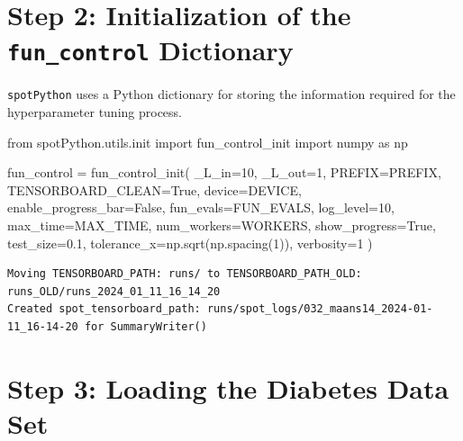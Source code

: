 \documentclass[
  letterpaper,
  DIV=11,
  numbers=noendperiod]{scrreprt}
\newenvironment{Shaded}{\begin{snugshade}}{\end{snugshade}}
\newcommand{\DecValTok}[1]{\textcolor[rgb]{0.68,0.00,0.00}{#1}}
\newcommand{\FloatTok}[1]{\textcolor[rgb]{0.68,0.00,0.00}{#1}}
\newcommand{\ImportTok}[1]{\textcolor[rgb]{0.00,0.46,0.62}{#1}}
\newcommand{\NormalTok}[1]{\textcolor[rgb]{0.00,0.23,0.31}{#1}}
\newcommand{\OperatorTok}[1]{\textcolor[rgb]{0.37,0.37,0.37}{#1}}
\newcommand{\VariableTok}[1]{\textcolor[rgb]{0.07,0.07,0.07}{#1}}
\begin{document}
\section{\texorpdfstring{Step 2: Initialization of the
\texttt{fun\_control}
Dictionary}{Step 2: Initialization of the fun\_control Dictionary}}\label{step-2-initialization-of-the-fun_control-dictionary-1}

\texttt{spotPython} uses a Python dictionary for storing the information
required for the hyperparameter tuning process.

\begin{Shaded}
\begin{Highlighting}[]
\ImportTok{from}\NormalTok{ spotPython.utils.init }\ImportTok{import}\NormalTok{ fun\_control\_init}
\ImportTok{import}\NormalTok{ numpy }\ImportTok{as}\NormalTok{ np}

\NormalTok{fun\_control }\OperatorTok{=}\NormalTok{ fun\_control\_init(}
\NormalTok{    \_L\_in}\OperatorTok{=}\DecValTok{10}\NormalTok{,}
\NormalTok{    \_L\_out}\OperatorTok{=}\DecValTok{1}\NormalTok{,}
\NormalTok{    PREFIX}\OperatorTok{=}\NormalTok{PREFIX,}
\NormalTok{    TENSORBOARD\_CLEAN}\OperatorTok{=}\VariableTok{True}\NormalTok{,}
\NormalTok{    device}\OperatorTok{=}\NormalTok{DEVICE,}
\NormalTok{    enable\_progress\_bar}\OperatorTok{=}\VariableTok{False}\NormalTok{,}
\NormalTok{    fun\_evals}\OperatorTok{=}\NormalTok{FUN\_EVALS,}
\NormalTok{    log\_level}\OperatorTok{=}\DecValTok{10}\NormalTok{,}
\NormalTok{    max\_time}\OperatorTok{=}\NormalTok{MAX\_TIME,}
\NormalTok{    num\_workers}\OperatorTok{=}\NormalTok{WORKERS,}
\NormalTok{    show\_progress}\OperatorTok{=}\VariableTok{True}\NormalTok{,}
\NormalTok{    test\_size}\OperatorTok{=}\FloatTok{0.1}\NormalTok{,}
\NormalTok{    tolerance\_x}\OperatorTok{=}\NormalTok{np.sqrt(np.spacing(}\DecValTok{1}\NormalTok{)),}
\NormalTok{    verbosity}\OperatorTok{=}\DecValTok{1}
\NormalTok{    )}
\end{Highlighting}
\end{Shaded}

\begin{verbatim}
Moving TENSORBOARD_PATH: runs/ to TENSORBOARD_PATH_OLD: runs_OLD/runs_2024_01_11_16_14_20
Created spot_tensorboard_path: runs/spot_logs/032_maans14_2024-01-11_16-14-20 for SummaryWriter()
\end{verbatim}

\section{Step 3: Loading the Diabetes Data
Set}\label{step-3-loading-the-diabetes-data-set-1}
\end{document}
